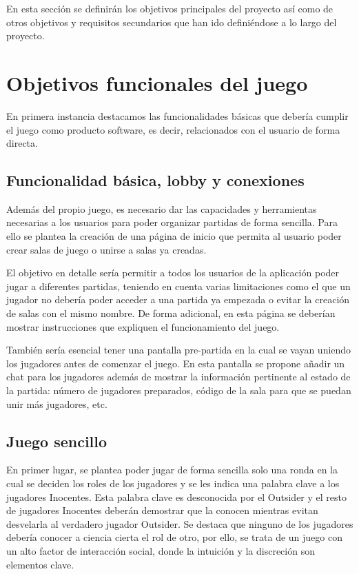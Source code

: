 En esta sección se definirán los objetivos principales del proyecto así como de otros objetivos y
requisitos secundarios que han ido definiéndose a lo largo del proyecto.

\section{Objetivos funcionales del juego} \label{Objetivos}

En primera instancia destacamos las funcionalidades básicas que debería cumplir el juego como
producto software, es decir, relacionados con el usuario de forma directa.

\subsection{Funcionalidad básica, lobby y conexiones}

Además del propio juego, es necesario dar las capacidades y herramientas necesarias a los usuarios para
poder organizar partidas de forma sencilla. Para ello se plantea la creación de una página de inicio que
permita al usuario poder crear salas de juego o unirse a salas ya creadas.

El objetivo en detalle sería permitir a todos los usuarios de la aplicación poder jugar a
diferentes partidas, teniendo en cuenta varias limitaciones como el que un jugador no debería poder acceder
a una partida ya empezada o evitar la creación de salas con el mismo nombre. De forma adicional, en esta página se deberían mostrar instrucciones que expliquen el funcionamiento
del juego.

También sería esencial tener una pantalla pre-partida en la cual se vayan uniendo los jugadores
antes de comenzar el juego. En esta pantalla se propone añadir un chat para los jugadores además
de mostrar la información pertinente al estado de la partida: número de jugadores preparados, código de la
sala para que se puedan unir más jugadores, etc.

\subsection{Juego sencillo}

En primer lugar, se plantea poder jugar de forma sencilla solo una ronda en la cual se deciden los
roles de los jugadores y se les indica una palabra clave a los jugadores Inocentes. Esta palabra 
clave es desconocida por el Outsider y el resto de jugadores Inocentes deberán demostrar 
que la conocen mientras evitan desvelarla al verdadero jugador Outsider. Se destaca 
que ninguno de los jugadores debería conocer a ciencia cierta el rol de otro, por ello, se trata de un juego 
con un alto factor de interacción social, donde la intuición y la discreción son elementos clave.

